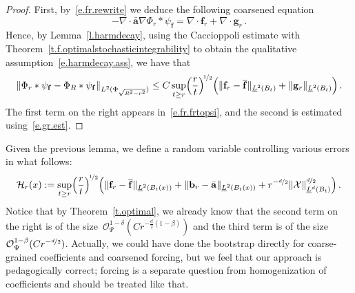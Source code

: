 \documentclass[11pt,twoside]{article} %
\numberwithin{equation}{section}
\theoremstyle{definition}
\let\originalleft\left
\let\originalright\right
\renewcommand{\left}{\mathopen{}\mathclose\bgroup\originalleft}
\renewcommand{\right}{\aftergroup\egroup\originalright}
\renewcommand{\b}{\ensuremath{\mathbf{b}}}
\newcommand{\g}{\mathbf{g}}
\newcommand{\f}{\mathbf{f}}
\renewcommand{\a}{\mathbf{a}}
\newcommand{\ahom}{\bar{\a}}
\newcommand{\X}{\mathcal{X}}
\renewcommand{\O}{\mathcal{O}}
\begin{document}
\begin{proof}
First, by~\eqref{e.fr.rewrite} we deduce the following coarsened equation
\begin{equation}  \label{e.fr.coarse.eq}
- \nabla \cdot \ahom \nabla \Phi_r \ast  \psi_{\f}  
= 
\nabla \cdot \f_r + \nabla \cdot \g_r 
\,. 
\end{equation}
Hence, by Lemma~\ref{l.harmdecay}, using the Caccioppoli estimate with Theorem~\ref{t.f.optimalstochasticintegrability} to obtain the qualitative assumption~\eqref{e.harmdecay.ass}, we have that 
\begin{equation*}  
\left\| \Phi_r \ast  \psi_{\f}  - \Phi_R \ast  \psi_{\f}  \right\|_{L^2 ( \Phi_{\sqrt{R^2-r^2}})} 
\leq 
C \sup_{t \geq r}  \Bigl( \frac{r}{t} \Bigr)^{\!\nicefrac12} 
\Bigl(  \| \f_r - \overline{\f} \|_{\underline{L}^2 \left( B_{t} \right)}  +  \| \g_r \|_{\underline{L}^2 \left( B_{t} \right)} \Bigr) \,.
\end{equation*}
The first term on the right appears in~\eqref{e.fr.frtopsi}, and the second is estimated using~\eqref{e.gr.est}.  
\end{proof}

Given the previous lemma, we define a random variable controlling various errors in what follows:
\begin{align}  \label{e.uglyH}
\mathcal{H}_r(x) := 
\sup_{t \geq r}  \Bigl( \frac{r}{t} \Bigr)^{\!\nicefrac12} 
\Bigl( 
\| \f_r - \overline{\f}  \|_{\underline{L}^2 \left( B_{t}(x) \right)} 
+ 
\| \b_r - \ahom  \|_{\underline{L}^2 \left( B_{t}(x) \right)} 
+ 
r^{-\nicefrac d2}  \| \X \|_{\underline{L}^d \left( B_{t} \right)}^{\nicefrac d2} 
\Bigr)
\,.
\end{align}
Notice that by Theorem~\ref{t.optimal}, we already know that the second term on the right is of the size~$\O_\Psi^{1-\delta}(Cr^{-\frac d2(1-\beta)})$ and the third term is of the size~$\O_\Psi^{1-\beta}(Cr^{-\nicefrac d2})$. Actually, we could have done the bootstrap directly for coarse-grained coefficients and coarsened forcing, but we feel that our approach is pedagogically correct; forcing is a separate question from homogenization of coefficients and should be treated like that. 
\end{document}

